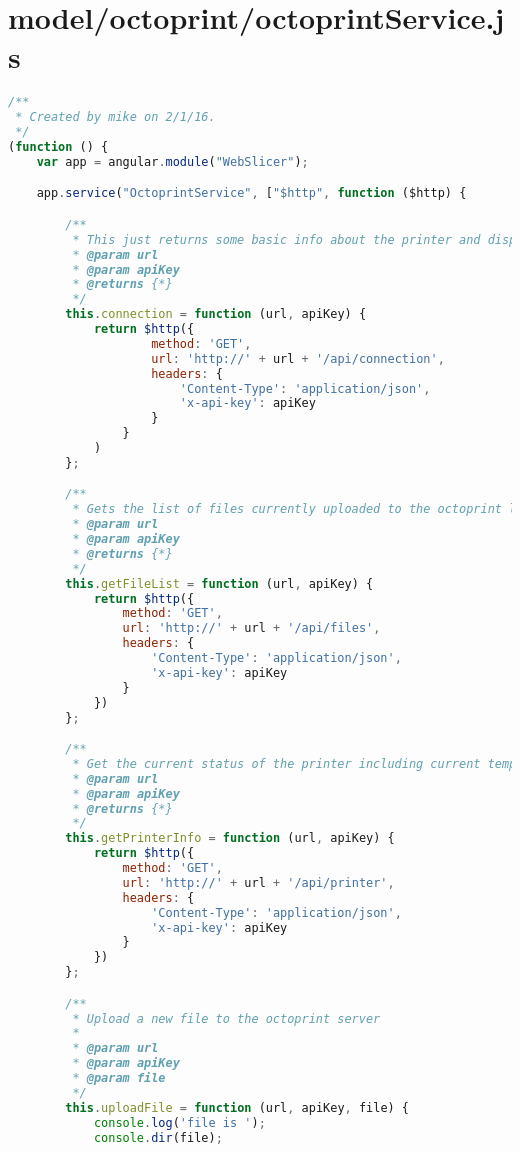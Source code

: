 \section{model/octoprint/octoprintService.js}
\begin{lstlisting}[language=JavaScript, label={lst:octoprintService}, caption=This file wrapped the octoprint API so that it could be easily integrated with the controller.]
/**
 * Created by mike on 2/1/16.
 */
(function () {
    var app = angular.module("WebSlicer");

    app.service("OctoprintService", ["$http", function ($http) {

        /**
         * This just returns some basic info about the printer and displays it.
         * @param url
         * @param apiKey
         * @returns {*}
         */
        this.connection = function (url, apiKey) {
            return $http({
                    method: 'GET',
                    url: 'http://' + url + '/api/connection',
                    headers: {
                        'Content-Type': 'application/json',
                        'x-api-key': apiKey
                    }
                }
            )
        };

        /**
         * Gets the list of files currently uploaded to the octoprint local address
         * @param url
         * @param apiKey
         * @returns {*}
         */
        this.getFileList = function (url, apiKey) {
            return $http({
                method: 'GET',
                url: 'http://' + url + '/api/files',
                headers: {
                    'Content-Type': 'application/json',
                    'x-api-key': apiKey
                }
            })
        };

        /**
         * Get the current status of the printer including current temps
         * @param url
         * @param apiKey
         * @returns {*}
         */
        this.getPrinterInfo = function (url, apiKey) {
            return $http({
                method: 'GET',
                url: 'http://' + url + '/api/printer',
                headers: {
                    'Content-Type': 'application/json',
                    'x-api-key': apiKey
                }
            })
        };

        /**
         * Upload a new file to the octoprint server
         *
         * @param url
         * @param apiKey
         * @param file
         */
        this.uploadFile = function (url, apiKey, file) {
            console.log('file is ');
            console.dir(file);


\end{lstlisting}
